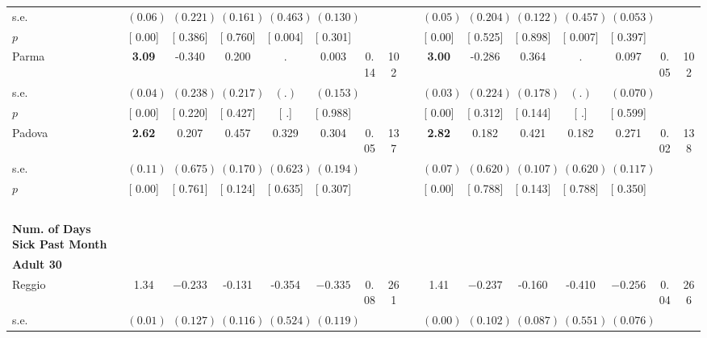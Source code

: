 \begin{longtable}{L{8em} c c c c c c c p{1em} c c c c c c c}
\quad \quad \quad \quad s.e.& $ (     0.06)$ & $ (    0.221)$ & $ (    0.161)$ & $ (    0.463)$ & $ (    0.130)$ & & & & $ (     0.05)$ & $ (    0.204)$ & $ (    0.122)$ & $ (    0.457)$ & $ (    0.053)$ & &  \\*
\quad \quad \quad \quad $ p$ & [     0.00] & [    0.386] & [    0.760] & [    0.004] & [    0.301] & & & & [     0.00] & [    0.525] & [    0.898] & [    0.007] & [    0.397] & &  \\[1em]
\quad \quad \quad Parma& \textbf{     3.09} &    -0.340 &     0.200 &         . &     0.003 &      0.14 &       102 & & \textbf{     3.00} &    -0.286 &     0.364 &         . &     0.097 &      0.05 &       102  \\*
\quad \quad \quad \quad s.e.& $ (     0.04)$ & $ (    0.238)$ & $ (    0.217)$ & $ (        .)$ & $ (    0.153)$ & & & & $ (     0.03)$ & $ (    0.224)$ & $ (    0.178)$ & $ (        .)$ & $ (    0.070)$ & &  \\*
\quad \quad \quad \quad $ p$ & [     0.00] & [    0.220] & [    0.427] & [        .] & [    0.988] & & & & [     0.00] & [    0.312] & [    0.144] & [        .] & [    0.599] & &  \\[1em]
\quad \quad \quad Padova& \textbf{     2.62} &     0.207 &     0.457 &     0.329 &     0.304 &      0.05 &       137 & & \textbf{     2.82} &     0.182 &     0.421 &     0.182 &     0.271 &      0.02 &       138  \\*
\quad \quad \quad \quad s.e.& $ (     0.11)$ & $ (    0.675)$ & $ (    0.170)$ & $ (    0.623)$ & $ (    0.194)$ & & & & $ (     0.07)$ & $ (    0.620)$ & $ (    0.107)$ & $ (    0.620)$ & $ (    0.117)$ & &  \\*
\quad \quad \quad \quad $ p$ & [     0.00] & [    0.761] & [    0.124] & [    0.635] & [    0.307] & & & & [     0.00] & [    0.788] & [    0.143] & [    0.788] & [    0.350] & &  \\[1em]
~\\[1em]
\textbf{Num. of Days Sick Past Month} \\*
\quad \quad \textbf{Adult 30} & & & & & & & & & & & & & & & \\* 
\quad \quad \quad Reggio& 1.34 & $ \mathbf{   -0.233}$ &    -0.131 &    -0.354 & $ \mathbf{   -0.335}$ &      0.08 &       261 & & 1.41 & $ \mathbf{   -0.237}$ &    -0.160 &    -0.410 & $ \mathbf{   -0.256}$ &      0.04 &       266  \\*
\quad \quad \quad \quad s.e.& $ (     0.01)$ & $ (    0.127)$ & $ (    0.116)$ & $ (    0.524)$ & $ (    0.119)$ & & & & $ (     0.00)$ & $ (    0.102)$ & $ (    0.087)$ & $ (    0.551)$ & $ (    0.076)$ & &  \\*

\end{longtable}
